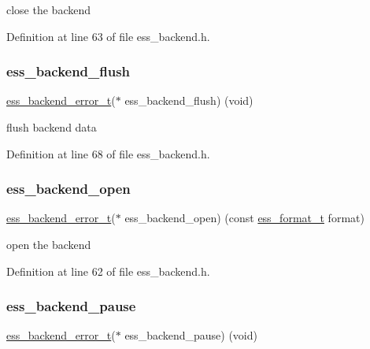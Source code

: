 close the backend 

Definition at line 63 of file ess\+\_\+backend.\+h.

\mbox{\label{structess__backend_ad5f882cfd71495bd8f0dc15540fb7c9a}} 
\subsubsection{\texorpdfstring{ess\+\_\+backend\+\_\+flush}{ess\_backend\_flush}}
{\footnotesize\ttfamily \hyperlink{ess__backend_8h_aa3de0496a3f361a6b38684e9cb65f01c}{ess\+\_\+backend\+\_\+error\+\_\+t}($\ast$  ess\+\_\+backend\+\_\+flush) (void)}

flush backend data 

Definition at line 68 of file ess\+\_\+backend.\+h.

\mbox{\label{structess__backend_ae6dfe97715fbf9f3fbf7b46a2d311e64}} 
\subsubsection{\texorpdfstring{ess\+\_\+backend\+\_\+open}{ess\_backend\_open}}
{\footnotesize\ttfamily \hyperlink{ess__backend_8h_aa3de0496a3f361a6b38684e9cb65f01c}{ess\+\_\+backend\+\_\+error\+\_\+t}($\ast$  ess\+\_\+backend\+\_\+open) (const \hyperlink{ess__format_8h_ab03f24cb5d42f4448f713bf1ec178163}{ess\+\_\+format\+\_\+t} format)}

open the backend 

Definition at line 62 of file ess\+\_\+backend.\+h.

\mbox{\label{structess__backend_ad263ce89d932658c73be2e5863d0afcf}} 
\subsubsection{\texorpdfstring{ess\+\_\+backend\+\_\+pause}{ess\_backend\_pause}}
{\footnotesize\ttfamily \hyperlink{ess__backend_8h_aa3de0496a3f361a6b38684e9cb65f01c}{ess\+\_\+backend\+\_\+error\+\_\+t}($\ast$  ess\+\_\+backend\+\_\+pause) (void)}


